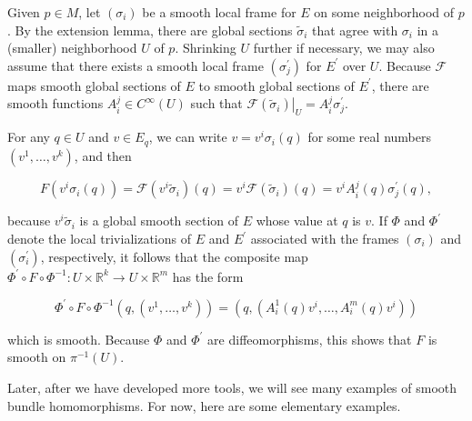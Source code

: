 \documentclass[10pt]{article}
\begin{document}
Given $p \in M$, let $\left(\sigma_{i}\right)$ be a smooth local frame for $E$ on some neighborhood of $p$. By the extension lemma, there are global sections $\widetilde{\sigma}_{i}$ that agree with $\sigma_{i}$ in a (smaller) neighborhood $U$ of $p$. Shrinking $U$ further if necessary, we may also assume that there exists a smooth local frame $\left(\sigma_{j}^{\prime}\right)$ for $E^{\prime}$ over $U$. Because $\mathcal{F}$ maps smooth global sections of $E$ to smooth global sections of $E^{\prime}$, there are smooth functions $A_{i}^{j} \in C^{\infty}(U)$ such that $\left.\mathscr{F}\left(\widetilde{\sigma}_{i}\right)\right|_{U}=A_{i}^{j} \sigma_{j}^{\prime}$.

For any $q \in U$ and $v \in E_{q}$, we can write $v=v^{i} \sigma_{i}(q)$ for some real numbers $\left(v^{1}, \ldots, v^{k}\right)$, and then

$$
F\left(v^{i} \sigma_{i}(q)\right)=\mathcal{F}\left(v^{i} \widetilde{\sigma}_{i}\right)(q)=v^{i} \mathcal{F}\left(\widetilde{\sigma}_{i}\right)(q)=v^{i} A_{i}^{j}(q) \sigma_{j}^{\prime}(q),
$$

because $v^{i} \widetilde{\sigma}_{i}$ is a global smooth section of $E$ whose value at $q$ is $v$. If $\Phi$ and $\Phi^{\prime}$ denote the local trivializations of $E$ and $E^{\prime}$ associated with the frames $\left(\sigma_{i}\right)$ and $\left(\sigma_{i}^{\prime}\right)$, respectively, it follows that the composite map $\Phi^{\prime} \circ F \circ \Phi^{-1}: U \times \mathbb{R}^{k} \rightarrow U \times \mathbb{R}^{m}$ has the form

$$
\Phi^{\prime} \circ F \circ \Phi^{-1}\left(q,\left(v^{1}, \ldots, v^{k}\right)\right)=\left(q,\left(A_{i}^{1}(q) v^{i}, \ldots, A_{i}^{m}(q) v^{i}\right)\right)
$$

which is smooth. Because $\Phi$ and $\Phi^{\prime}$ are diffeomorphisms, this shows that $F$ is smooth on $\pi^{-1}(U)$.

Later, after we have developed more tools, we will see many examples of smooth bundle homomorphisms. For now, here are some elementary examples.
\end{document}

